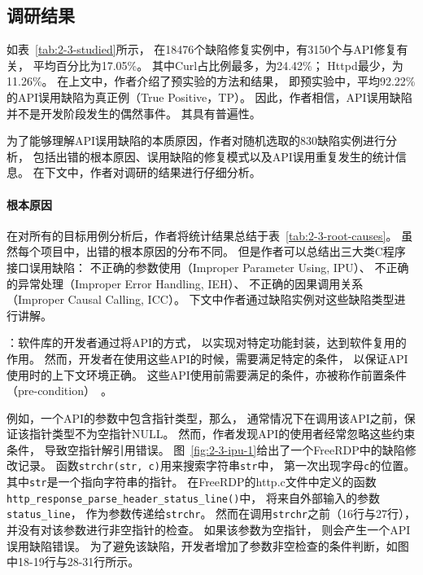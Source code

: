 
\subsection{调研结果}
如表~\ref{tab:2-3-studied}所示，
在18476个缺陷修复实例中，有3150个与API修复有关，
平均百分比为17.05\%。
其中Curl占比例最多，为24.42\%；
Httpd最少，为11.26\%。
在上文中，作者介绍了预实验的方法和结果，
即预实验中，平均92.22\%的API误用缺陷为真正例（True Positive，TP）。
因此，作者相信，API误用缺陷并不是开发阶段发生的偶然事件。
其具有普遍性。

\vspace*{10pt}
\begin{center}
\noindent{}
\end{center}

为了能够理解API误用缺陷的本质原因，作者对随机选取的830缺陷实例进行分析，
包括出错的根本原因、误用缺陷的修复模式以及API误用重复发生的统计信息。
在下文中，作者对调研的结果进行仔细分析。

\paragraph{根本原因}

在对所有的目标用例分析后，作者将统计结果总结于表~\ref{tab:2-3-root-causes}。
虽然每个项目中，出错的根本原因的分布不同。
但是作者可以总结出三大类C程序接口误用缺陷：
不正确的参数使用（Improper Parameter Using, IPU）、
不正确的异常处理（Improper Error Handling, IEH）、
不正确的因果调用关系（Improper Causal Calling, ICC）。
下文中作者通过缺陷实例对这些缺陷类型进行讲解。



\vspace*{10pt}
：软件库的开发者通过将API的方式，
以实现对特定功能封装，达到软件复用的作用。
然而，开发者在使用这些API的时候，需要满足特定的条件，
以保证API使用时的上下文环境正确。
这些API使用前需要满足的条件，亦被称作前置条件（pre-condition）~\cite{14-fse-pre}。

例如，一个API的参数中包含指针类型，那么，
通常情况下在调用该API之前，保证该指针类型不为空指针NULL。
然而，作者发现API的使用者经常忽略这些约束条件，
导致空指针解引用错误。
图~\ref{fig:2-3-ipu-1}给出了一个FreeRDP中的缺陷修改记录。
函数\texttt{strchr(str, c)}用来搜索字符串\texttt{str}中，
第一次出现字母\texttt{c}的位置。
其中\texttt{str}是一个指向字符串的指针。
在FreeRDP的http.c文件中定义的函数\texttt{http\_response\_parse\_header\_status\_line()}中，
将来自外部输入的参数\texttt{status\_line}，
作为参数传递给\texttt{strchr}。
然而在调用\texttt{strchr}之前（16行与27行），并没有对该参数进行非空指针的检查。
如果该参数为空指针，
则会产生一个API误用缺陷错误。
为了避免该缺陷，开发者增加了参数非空检查的条件判断，如图中18-19行与28-31行所示。



